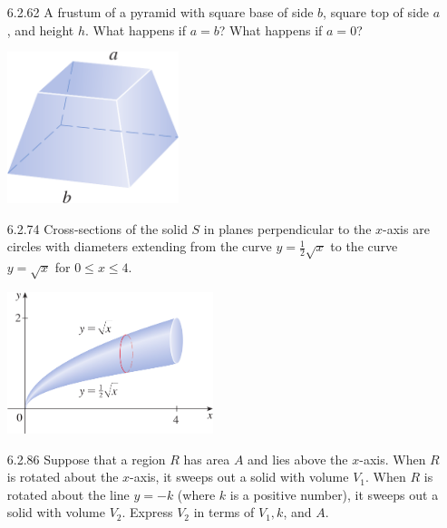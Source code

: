 \documentclass{article}
\begin{document}
\begin{enumerate}
\vspace{8cm}

\item[6.2.62]
    A frustum of a pyramid with square base of side $b$, square top of side $a$,
    and height $h$. What happens if $a=b$? What happens if $a=0$?

    \begin{center}
        \includegraphics[width=5cm]{./png/6.2.62.png}
    \end{center}

\newpage

\item[6.2.74]
    Cross-sections of the solid $S$ in planes perpendicular to the $x$-axis are
    circles with diameters extending from the curve $y=\frac{1}{2}\sqrt{x}$
    to the curve $y=\sqrt{x}$ for $0 \leqslant x \leqslant 4$.

    \begin{center}
        \includegraphics[width=6cm]{./png/6.2.74.png}
    \end{center}

\vspace{6cm}

\item[6.2.86]
    Suppose that a region $R$ has area $A$ and lies above the $x$-axis.
    When $R$ is rotated about the $x$-axis, it sweeps out a solid with
    volume $V_1$. When $R$ is rotated about the line $y=-k$ (where
    $k$ is a positive number), it sweeps out a solid with volume $V_2$.
    Express $V_2$ in terms of $V_1, k$, and $A$.

\newpage


\end{enumerate}
\end{document}
